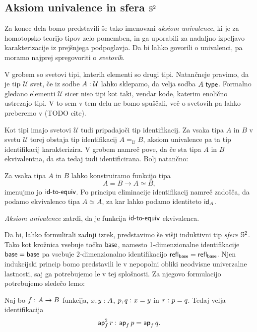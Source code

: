 \subsection{Aksiom univalence in sfera \(\mathbb{S}^{2}\)}

Za konec dela bomo predstavili še tako imenovani \emph{aksiom univalence}, ki je za homotopsko teorijo tipov zelo pomemben, in ga uporabili za nadaljno izpeljavo karakterizacije iz prejšnjega podpoglavja. Da bi lahko govorili o univalenci, pa moramo najprej spregovoriti o \emph{svetovih}.

V grobem so svetovi tipi, katerih elementi so drugi tipi. Natančneje pravimo, da je tip \(\mathcal{U}\) svet, če iz sodbe \(A : \mathcal{U}\) lahko sklepamo, da velja sodba \(A\ \textnormal{\textsf{type}}\). Formalno gledano elementi \(\mathcal{U}\) sicer niso tipi kot taki, vendar kode, katerim enolično ustrezajo tipi. V to sem v tem delu ne bomo spuščali, več o svetovih pa lahko preberemo v (TODO cite).

Kot tipi imajo svetovi \(\mathcal{U}\) tudi pripadajoči tip identifikacij. Za vsaka tipa \(A\) in \(B\) v svetu \(\mathcal{U}\) torej obstaja tip identifikacij \(A =_{\mathcal{U}} B\), aksiom univalence pa ta tip identifikacij karakterizira. V grobem namreč pove, da če sta tipa \(A\) in \(B\) ekvivalentna, da sta tedaj tudi identificirana. Bolj natančno:

\begin{definicija}
  Za vsaka tipa \(A\) in \(B\) lahko konstruiramo funkcijo tipa \[A = B \to A \simeq B,\]
  imenujmo jo \(\textnormal{\textsf{id-to-equiv}}\).
  Po principu eliminacije identifikacij namreč zadošča, da podamo ekvivalenco tipa \(A \simeq A\), za kar lahko podamo identiteto \(\textnormal{\textsf{id}}_{A}\).

  \emph{Aksiom univalence} zatrdi, da je funkcija \(\textnormal{\textsf{id-to-equiv}}\) ekvivalenca.
\end{definicija}

Da bi, lahko formulirali zadnji izrek, predstavimo še višji induktivni tip \emph{sfere} \(\mathbb{S}^{2}\). Tako kot krožnica vsebuje točko \(\textnormal{\textsf{base}}\), namesto 1-dimenzionalne identifikacije \(\textnormal{\textsf{base}} = \textnormal{\textsf{base}}\) pa vsebuje 2-dimenzionalno identifikacijo \(\textnormal{\textsf{refl}}_{\textnormal{\textsf{base}}} = \textnormal{\textsf{refl}}_{\textnormal{\textsf{base}}}\). Njen indukcijski princip bomo predstavili le v nepopolni obliki neodvisne univerzalne lastnosti, saj ga potrebujemo le v tej splošnosti. Za njegovo formulacijo potrebujemo sledečo lemo:

\begin{lema}
  Naj bo \(f \,\colon A \to B\) funkcija, \(x, y : A\), \(p, q \,\colon x = y\) in \(r \,\colon p = q\). Tedaj velja identifikacija
  \[\textnormal{\textsf{ap}}_{f}^{2}\,r \,\colon \textnormal{\textsf{ap}}_{f}\,p = \textnormal{\textsf{ap}}_{f}\,q.\]
\end{lema}

